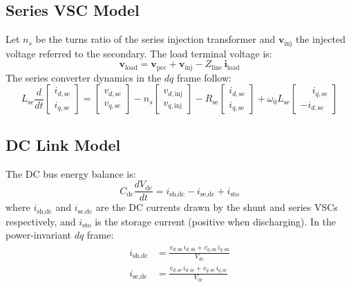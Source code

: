 \documentclass[conference]{IEEEtran}
\begin{document}
\subsection{Series VSC Model}

Let $n_s$ be the turns ratio of the series injection transformer
and $\bm{v}_\text{inj}$ the injected voltage referred to the secondary.
The load terminal voltage is:
\begin{equation}
  \bm{v}_\text{load} = \bm{v}_\text{pcc} + \bm{v}_\text{inj}
                      - Z_\text{line}\,\bm{i}_\text{load}
  \label{eq:series_voltage}
\end{equation}
The series converter dynamics in the $dq$ frame follow:
\begin{equation}
  L_\text{se}\frac{d}{dt}
  \begin{bmatrix} i_{d,\text{se}} \\ i_{q,\text{se}} \end{bmatrix}
  =
  \begin{bmatrix} v_{d,\text{se}} \\ v_{q,\text{se}} \end{bmatrix}
  - n_s
  \begin{bmatrix} v_{d,\text{inj}} \\ v_{q,\text{inj}} \end{bmatrix}
  - R_\text{se}
  \begin{bmatrix} i_{d,\text{se}} \\ i_{q,\text{se}} \end{bmatrix}
  + \omega_0 L_\text{se}
  \begin{bmatrix} \phantom{-}i_{q,\text{se}} \\ -i_{d,\text{se}} \end{bmatrix}
  \label{eq:series_dq}
\end{equation}

\subsection{DC Link Model}

The DC bus energy balance is:
\begin{equation}
  C_\text{dc}\frac{dV_\text{dc}}{dt}
  = i_\text{sh,dc} - i_\text{se,dc} + i_\text{sto}
  \label{eq:dclink}
\end{equation}
where $i_\text{sh,dc}$ and $i_\text{se,dc}$ are the DC currents
drawn by the shunt and series VSCs respectively, and $i_\text{sto}$
is the storage current (positive when discharging).
In the power-invariant $dq$ frame:
\begin{align}
  i_\text{sh,dc} &= \frac{v_{d,\text{sh}}\,i_{d,\text{sh}}
                        + v_{q,\text{sh}}\,i_{q,\text{sh}}}{V_\text{dc}}
  \label{eq:psh_dc} \\
  i_\text{se,dc} &= \frac{v_{d,\text{se}}\,i_{d,\text{se}}
                        + v_{q,\text{se}}\,i_{q,\text{se}}}{V_\text{dc}}
  \label{eq:pse_dc}
\end{align}
\end{document}
